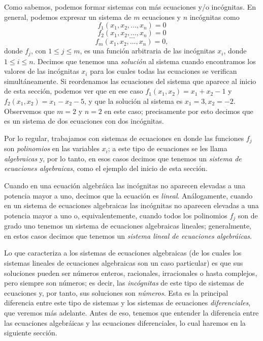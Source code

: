 \documentclass[12pt,libertine]{book}
\begin{document}
\vspace{3mm}
Como sabemos, podemos formar sistemas con más ecuaciones y/o incógnitas. En general, podemos expresar un sistema de $m$ ecuaciones y $n$ incógnitas como $$f_1(x_1,x_2,...,x_n)=0$$ $$f_2(x_1,x_2,...,x_n)=0$$ $$...$$ $$f_m(x_1,x_2,...,x_n)=0,$$ donde $f_j$, con $1\leq j\leq m$, es una función arbitraria de las incógnitas $x_i$, donde $1\leq i\leq n$. Decimos que tenemos una \emph{solución} al sistema cuando encontramos los valores de las incógnitas $x_i$ para los cuales todas las ecuaciones se verifican simultáneamente. Si reordenamos las ecuaciones del sistema que aparece al inicio de esta sección, podemos ver que en ese caso $f_1(x_1,x_2)=x_1+x_2-1$ y $f_2(x_1,x_2)=x_1-x_2-5$, y que la solución al sistema es $x_1=3, x_2=-2$. Observemos que $m=2$ y $n=2$ en este caso; precisamente por esto decimos que es un sistema de dos ecuaciones con dos incógnitas.

\vspace{3mm}
Por lo regular, trabajamos con sistemas de ecuaciones en donde las funciones $f_j$ son \emph{polinomios} en las variables $x_i$; a este tipo de ecuaciones se les llama \emph{algebraicas} y, por lo tanto, en esos casos decimos que tenemos un \emph{sistema de ecuaciones algebraicas}, como el ejemplo del inicio de esta sección.

\vspace{3mm}
Cuando en una ecuación algebráica las incógnitas no aparecen elevadas a una potencia mayor a uno, decimos que la ecuación es \emph{lineal}. Análogamente, cuando en un sistema de ecuaciones algebraicas las incógnitas no aparecen elevadas a una potencia mayor a uno \textemdash o, equivalentemente, cuando todos los polinomios $f_j$ son de grado uno\textemdash\hspace{1mm} tenemos un sistema de ecuaciones algebraicas lineales; generalmente, en estos casos decimos que tenemos un \emph{sistema lineal de ecuaciones algebráicas}.

\vspace{3mm}
Lo que caracteriza a los sistemas de ecuaciones algebraicas (de los cuales los sistemas lineales de ecuaciones algebraicas son un caso particular) es que sus soluciones pueden ser números enteros, racionales, irracionales o hasta complejos, pero siempre son números; es decir, las \emph{incógnitas} de este tipo de sistemas de ecuaciones \textemdash y, por tanto, sus soluciones\textemdash\hspace{1mm} son \emph{números}. Esta es la principal diferencia entre este tipo de sistemas y los sistemas de ecuaciones \emph{diferenciales}, que veremos más adelante. Antes de eso, tenemos que entender la diferencia entre las ecuaciones algebráicas y las ecuaciones diferenciales, lo cual haremos en la siguiente sección.
\end{document}

